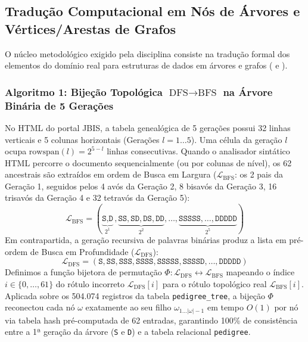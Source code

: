 \documentclass[conference]{IEEEtran}
\begin{document}
\subsection{Tradução Computacional em Nós de Árvores e Vértices/Arestas de Grafos}
O núcleo metodológico exigido pela disciplina consiste na tradução formal dos elementos do domínio real para estruturas de dados em árvores e grafos ( e ).

\subsubsection{Algoritmo 1: Bijeção Topológica $\text{DFS}\to\text{BFS}$ na Árvore Binária de 5 Gerações}
No HTML do portal JBIS, a tabela genealógica de 5 gerações possui 32 linhas verticais e 5 colunas horizontais (Gerações $l = 1 \dots 5$). Uma célula da geração $l$ ocupa $\text{rowspan}(l) = 2^{5-l}$ linhas consecutivas. Quando o analisador sintático HTML percorre o documento sequencialmente (ou por colunas de nível), os 62 ancestrais são extraídos em ordem de Busca em Largura ($\mathcal{L}_{\text{BFS}}$: os 2 pais da Geração 1, seguidos pelos 4 avós da Geração 2, 8 bisavós da Geração 3, 16 trisavós da Geração 4 e 32 tetravós da Geração 5):
\begin{equation}
    \mathcal{L}_{\text{BFS}} = (\underbrace{\texttt{S}, \texttt{D}}_{2^1}, \underbrace{\texttt{SS}, \texttt{SD}, \texttt{DS}, \texttt{DD}}_{2^2}, \dots, \underbrace{\texttt{SSSSS}, \dots, \texttt{DDDDD}}_{2^5})
\end{equation}
Em contrapartida, a geração recursiva de palavras binárias produz a lista em pré-ordem de Busca em Profundidade ($\mathcal{L}_{\text{DFS}}$):
\begin{equation}
    \mathcal{L}_{\text{DFS}} = (\texttt{S}, \texttt{SS}, \texttt{SSS}, \texttt{SSSS}, \texttt{SSSSS}, \texttt{SSSSD}, \dots, \texttt{DDDDD})
\end{equation}
Definimos a função bijetora de permutação $\Phi: \mathcal{L}_{\text{DFS}} \leftrightarrow \mathcal{L}_{\text{BFS}}$ mapeando o índice $i \in \{0, \dots, 61\}$ do rótulo incorreto $\mathcal{L}_{\text{DFS}}[i]$ para o rótulo topológico real $\mathcal{L}_{\text{BFS}}[i]$. Aplicada sobre os 504.074 registros da tabela \texttt{pedigree\_tree}, a bijeção $\Phi$ reconectou cada nó $\omega$ exatamente ao seu filho $\omega_{1 \dots |\omega|-1}$ em tempo $O(1)$ por nó via tabela hash pré-computada de 62 entradas, garantindo 100\%
de consistência entre a 1ª geração da árvore (\texttt{S} e \texttt{D}) e a tabela relacional \texttt{pedigree}.
\end{document}
